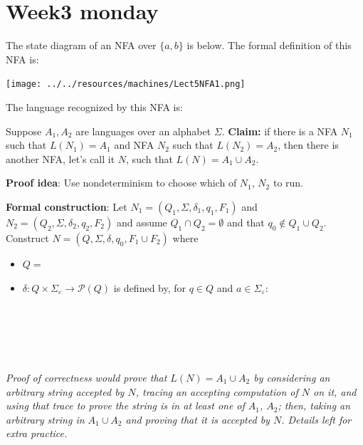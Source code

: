 \documentclass[12pt, oneside]{article}
\begin{document}
\begin{flushright}
\end{flushright} \section*{Week3 monday}


The state diagram of an NFA over $\{a,b\}$ is below.  The formal definition of this NFA is:

\texttt{[image: ../../resources/machines/Lect5NFA1.png]}

The language recognized by this NFA is: 



Suppose $A_1, A_2$ are languages over an alphabet $\Sigma$.
{\bf Claim:} if there is a NFA $N_1$ such that $L(N_1) = A_1$ and 
NFA $N_2$ such that $L(N_2) = A_2$, then there is another NFA, let's call it $N$, such that 
$L(N) = A_1 \cup A_2$.

{\bf Proof idea}: Use nondeterminism to choose which of $N_1$, $N_2$ to run.


{\bf Formal construction}: Let 
$N_1 = (Q_1, \Sigma, \delta_1, q_1, F_1)$ and $N_2 = (Q_2, \Sigma, \delta_2,q_2, F_2)$
and assume $Q_1 \cap Q_2 = \emptyset$ and that $q_0 \notin Q_1 \cup Q_2$.
Construct $N = (Q, \Sigma, \delta, q_0, F_1 \cup F_2)$ where
\begin{itemize}
    \item $Q = $
    \item $\delta: Q \times \Sigma_\varepsilon \to \mathcal{P}(Q)$ is defined by, for $q \in Q$ and $a \in \Sigma_{\varepsilon}$:
        \[
            \phantom{\delta((q,a))=\begin{cases}  \delta_1 ((q,a)) &\qquad\text{if } q\in Q_1 \\ \delta_2 ((q,a)) &\qquad\text{if } q\in Q_2 \\ \{q1,q2\} &\qquad\text{if } q = q_0, a = \varepsilon \\ \emptyset\text{if } q= q_0, a \neq \varepsilon \end{cases}}
        \]
\end{itemize}


\vfill
{\it Proof of correctness would prove that $L(N) = A_1 \cup A_2$ by considering
an arbitrary string accepted by $N$, tracing an accepting computation of $N$ on it, and using 
that trace to prove the string is in at least one of $A_1$, $A_2$; then, taking an arbitrary 
string in $A_1 \cup A_2$ and proving that it is accepted by $N$. Details left for extra practice.}
\end{document}
